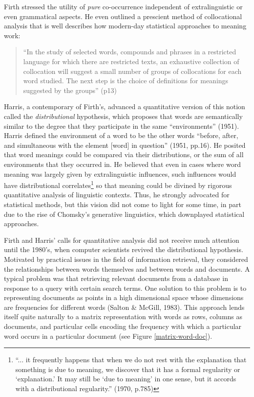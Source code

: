 \documentclass[man,floatsintext]{apa6}
\begin{document}
Firth stressed the utility of \emph{pure} co-occurrence independent of extralinguistic or even grammatical aspects. He even outlined a prescient method of collocational analysis that is well describes how modern-day statistical approaches to meaning work:
\begin{quote}
  ``In the study of selected words, compounds and phrases in a restricted language for which there are restricted texts, an exhaustive collection of collocation will suggest a small number of groups of collocations for each word studied. The next step is the choice of definitions for meanings suggested by the groups'' (p13)
\end{quote}

Harris, a contemporary of Firth's, advanced a quantitative version of this notion called the \emph{distributional} hypothesis, which proposes that words are semantically similar to the degree that they participate in the same ``environments'' (1951). Harris defined the environment of a word to be the other words ``before, after, and simultaneous with the element [word] in question'' (1951, pp.16). He posited that word meanings could be compared via their distributions, or the sum of all environments that they occurred in. He believed that even in cases where word meaning was largely given by extralinguistic influences, such influences would have distributional correlates\footnote{``... it frequently happens that when we do not rest with the explanation that something is due to meaning, we discover that it has a formal regularity or `explanation.' It may still be `due to meaning' in one sense, but it accords with a distributional regularity.'' (1970, p.785)} so that meaning could be divined by rigorous quantitative analysis of linguistic contexts. Thus, he strongly advocated for statistical methods, but this vision did not come to light for some time, in part due to the rise of Chomsky's generative linguistics, which downplayed statistical approaches.

Firth and Harris' calls for quantitative analysis did not receive much attention until the 1980's, when computer scientists revived the distributional hypothesis. Motivated by practical issues in the field of information retrieval, they considered the relationships between words themselves and between words and documents. A typical problem was that retrieving relevant documents from a database in response to a query with certain search terms. One solution to this problem is to representing documents as points in a high dimensional space whose dimensions are frequencies for different words (Salton \& McGill, 1983). This approach lends itself quite naturally to a matrix representation with words as rows, columns as documents, and particular cells encoding the frequency with which a particular word occurs in a particular document (see Figure \ref{matrix-word-doc}).
\end{document}
